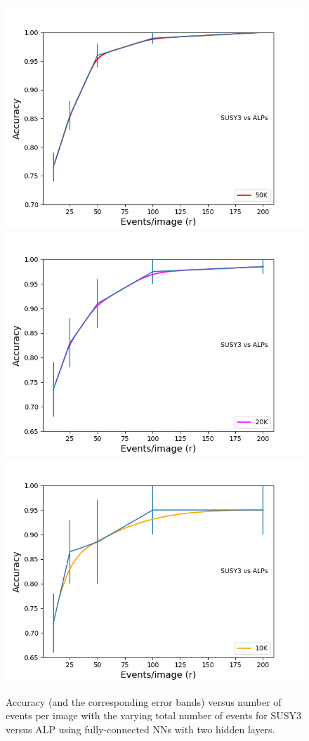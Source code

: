 \documentclass[prd,aps,letterpaper,floatfix,superscriptaddress,preprintnumbers,twocolumn,10pt,nofootinbib]{revtex4-1}
\begin{document}
 
\begin{figure}%
\centering
\includegraphics[scale=0.50]{figures/accuracyband2dSUSY3vsAxion50k.png}
\includegraphics[scale=0.50]{figures/accuracyband2dSUSY3vsAxion20k.png}
\includegraphics[scale=0.50]{figures/accuracyband2dSUSY3vsAxion10k.png}
\caption{Accuracy (and the corresponding error bands) versus number of events per image with the varying total number of events for SUSY3 versus ALP using fully-connected NNs with two hidden layers.} \label{accuracy2}
\end{figure}
\end{document}
